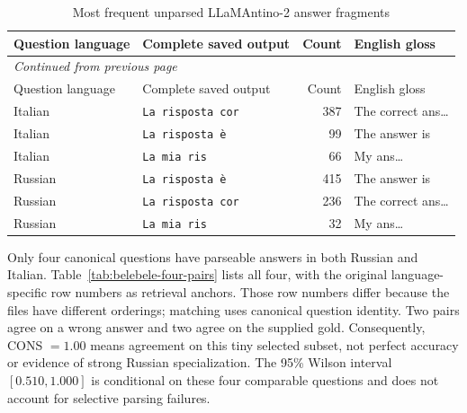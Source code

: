 \begingroup\footnotesize\setlength{\tabcolsep}{4pt}\renewcommand{\arraystretch}{1.15}
\begin{longtable}{p{2.1cm}p{4.0cm}rp{4.4cm}}
\caption{Most frequent unparsed LLaMAntino-2 answer fragments}\label{tab:belebele-unparsed-fragments}\\

\toprule
Question language & Complete saved output & Count & English gloss\\
\midrule
\endfirsthead
\multicolumn{4}{l}{\textit{Continued from previous page}}\\
\toprule
Question language & Complete saved output & Count & English gloss\\
\midrule
\endhead


Italian & \texttt{La risposta cor} & 387 & The correct ans…\\

Italian & \texttt{La risposta è} & 99 & The answer is\\

Italian & \texttt{La mia ris} & 66 & My ans…\\

Russian & \texttt{La risposta è} & 415 & The answer is\\

Russian & \texttt{La risposta cor} & 236 & The correct ans…\\

Russian & \texttt{La mia ris} & 32 & My ans…\\

\bottomrule
\end{longtable}


\endgroup

Only four canonical questions have parseable answers in both Russian and Italian. Table~\ref{tab:belebele-four-pairs} lists all four, with the original language-specific row numbers as retrieval anchors. Those row numbers differ because the files have different orderings; matching uses canonical question identity. Two pairs agree on a wrong answer and two agree on the supplied gold. Consequently, CONS $=1.00$ means agreement on this tiny selected subset, not perfect accuracy or evidence of strong Russian specialization. The 95\% Wilson interval $[0.510,1.000]$ is conditional on these four comparable questions and does not account for selective parsing failures.

